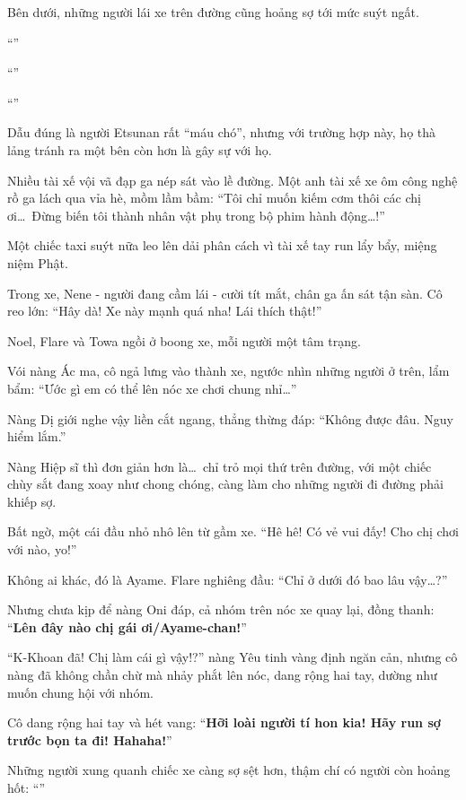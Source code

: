 \documentclass[../main.tex]{subfiles}
\begin{document}
Bên dưới, những người lái xe trên đường cũng hoảng sợ tới mức suýt ngất.

``''

``''

``''

Dẫu đúng là người Etsunan rất ``máu chó'', nhưng với trường hợp này, họ thà lảng tránh ra một bên còn hơn là gây sự với họ.

Nhiều tài xế vội vã đạp ga nép sát vào lề đường. Một anh tài xế xe ôm công nghệ rồ ga lách qua vỉa hè, mồm lầm bầm: ``Tôi chỉ muốn kiếm cơm thôi các chị ơi\dots\ Đừng biến tôi thành nhân vật phụ trong bộ phim hành động\dots!''

Một chiếc taxi suýt nữa leo lên dải phân cách vì tài xế tay run lẩy bẩy, miệng niệm Phật.

Trong xe, Nene - người đang cầm lái - cười tít mắt, chân ga ấn sát tận sàn. Cô reo lớn: ``Hây dà! Xe này mạnh quá nha! Lái thích thật!''

Noel, Flare và Towa ngồi ở boong xe, mỗi người một tâm trạng.

Vói nàng Ác ma, cô ngả lưng vào thành xe, ngước nhìn những người ở trên, lẩm bẩm: ``Ước gì em có thể lên nóc xe chơi chung nhỉ\dots''

Nàng Dị giới nghe vậy liền cắt ngang, thẳng thừng đáp: ``Không được đâu. Nguy hiểm lắm.''

Nàng Hiệp sĩ thì đơn giản hơn là\dots\ chỉ trỏ mọi thứ trên đường, với một chiếc chùy sắt đang xoay như chong chóng, càng làm cho những người đi đường phải khiếp sợ.

Bất ngờ, một cái đầu nhỏ nhô lên từ gầm xe. ``Hê hê! Có vẻ vui đấy! Cho chị chơi với nào, yo!''

Không ai khác, đó là Ayame. Flare nghiêng đầu: ``Chỉ ở dưới đó bao lâu vậy\dots?''

Nhưng chưa kịp để nàng Oni đáp, cả nhóm trên nóc xe quay lại, đồng thanh: ``\textbf{Lên đây nào chị gái ơi/Ayame-chan!}''

``K-Khoan đã! Chị làm cái gì vậy!?'' nàng Yêu tinh vàng định ngăn cản, nhưng cô nàng đã không chần chừ mà nhảy phắt lên nóc, dang rộng hai tay, dường như muốn chung hội với nhóm.

Cô dang rộng hai tay và hét vang: ``\textbf{Hỡi loài người tí hon kia! Hãy run sợ trước bọn ta đi! Hahaha!}''

Những người xung quanh chiếc xe càng sợ sệt hơn, thậm chí có người còn hoảng hốt: ``''
\end{document}

